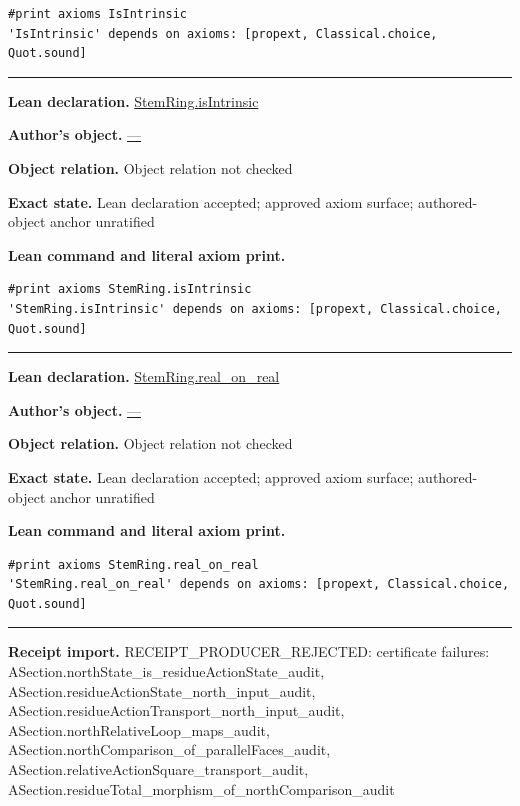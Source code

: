 \documentclass[11pt]{article}
\theoremstyle{plain}
\theoremstyle{definition}
\theoremstyle{remark}
\begin{document}
\begin{tcolorbox}
\begin{Verbatim}[breaklines=true,breakanywhere=true,fontsize=\small]
#print axioms IsIntrinsic
'IsIntrinsic' depends on axioms: [propext, Classical.choice, Quot.sound]
\end{Verbatim}
\medskip\hrule\medskip
\textbf{Lean declaration.} \url{StemRing.isIntrinsic}
\par\textbf{Author's object.} \url{—}
\par\textbf{Object relation.} Object relation not checked
\par\textbf{Exact state.} Lean declaration accepted; approved axiom surface; authored-object anchor unratified
\par\smallskip\textbf{Lean command and literal axiom print.}
\begin{Verbatim}[breaklines=true,breakanywhere=true,fontsize=\small]
#print axioms StemRing.isIntrinsic
'StemRing.isIntrinsic' depends on axioms: [propext, Classical.choice, Quot.sound]
\end{Verbatim}
\medskip\hrule\medskip
\textbf{Lean declaration.} \url{StemRing.real_on_real}
\par\textbf{Author's object.} \url{—}
\par\textbf{Object relation.} Object relation not checked
\par\textbf{Exact state.} Lean declaration accepted; approved axiom surface; authored-object anchor unratified
\par\smallskip\textbf{Lean command and literal axiom print.}
\begin{Verbatim}[breaklines=true,breakanywhere=true,fontsize=\small]
#print axioms StemRing.real_on_real
'StemRing.real_on_real' depends on axioms: [propext, Classical.choice, Quot.sound]
\end{Verbatim}
\medskip\hrule\medskip
\textbf{Receipt import.} \textcolor{KgtRed}{RECEIPT\_PRODUCER\_REJECTED: certificate failures: ASection.northState\_is\_residueActionState\_audit, ASection.residueActionState\_north\_input\_audit, ASection.residueActionTransport\_north\_input\_audit, ASection.northRelativeLoop\_maps\_audit, ASection.northComparison\_of\_parallelFaces\_audit, ASection.relativeActionSquare\_transport\_audit, ASection.residueTotal\_morphism\_of\_northComparison\_audit}
\end{tcolorbox}
\medskip
\end{document}
